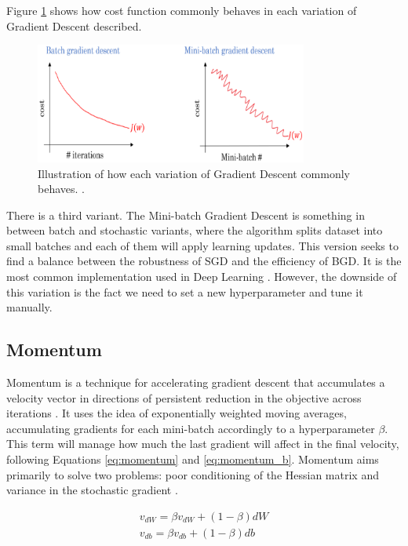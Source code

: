 Figure \ref{fig:lossfunctiongdvariants} shows how cost function commonly behaves in each variation of Gradient Descent described.

\begin{figure}[!htbp]
	\centering
	\includegraphics[width=0.8\textwidth]{Cap3/lossfunctiongdvariants.eps}
	\caption{Illustration of how each variation of Gradient Descent commonly behaves.
	\cite{dabbura2017}.
	}
	\label{fig:lossfunctiongdvariants}
\end{figure}



There is a third variant. The Mini-batch Gradient Descent is something in between batch and stochastic variants, where the algorithm splits dataset into small batches and each of them will apply learning updates. This version seeks to find a balance between the robustness of SGD and the efficiency of BGD. It is the most common implementation used in Deep Learning \cite{brownlee2017}. However, the downside of this variation is the fact we need to set a new hyperparameter and tune it manually.



\subsection{Momentum}

Momentum is a technique for accelerating gradient descent that accumulates a velocity vector in directions of persistent reduction in the objective across iterations \cite{Sutskever:2013:IIM:3042817.3043064}. It uses the idea of exponentially weighted moving averages, accumulating gradients for each mini-batch accordingly to a hyperparameter $\beta$. This term will manage how much the last gradient will affect in the final velocity, following Equations \ref{eq:momentum} and \ref{eq:momentum_b}. Momentum aims primarily to solve two problems: poor conditioning of the
Hessian matrix and variance in the stochastic gradient \cite{Goodfellow-et-al-2016}.


\begin{align}\label{eq:momentum}
v_{dW} = \beta v_{dW} + (1 - \beta)dW\\
v_{db} = \beta v_{db} + (1 - \beta)db
\label{eq:momentum_b}
\end{align}


